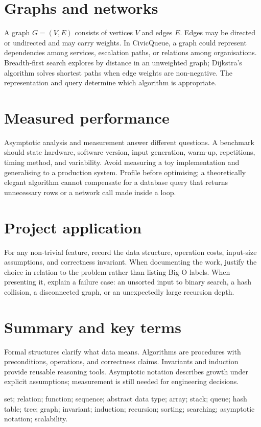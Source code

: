 \section{Graphs and networks}
A graph $G=(V,E)$ consists of vertices $V$ and edges $E$. Edges may be directed or undirected and may carry weights. In CivicQueue, a graph could represent dependencies among services, escalation paths, or relations among organisations. Breadth-first search explores by distance in an unweighted graph; Dijkstra's algorithm solves shortest paths when edge weights are non-negative. The representation and query determine which algorithm is appropriate.

\section{Measured performance}
Asymptotic analysis and measurement answer different questions. A benchmark should state hardware, software version, input generation, warm-up, repetitions, timing method, and variability. Avoid measuring a toy implementation and generalising to a production system. Profile before optimising; a theoretically elegant algorithm cannot compensate for a database query that returns unnecessary rows or a network call made inside a loop.

\section{Project application}
For any non-trivial feature, record the data structure, operation costs, input-size assumptions, and correctness invariant. When documenting the work, justify the choice in relation to the problem rather than listing Big-O labels. When presenting it, explain a failure case: an unsorted input to binary search, a hash collision, a disconnected graph, or an unexpectedly large recursion depth.

\section{Summary and key terms}
Formal structures clarify what data means. Algorithms are procedures with preconditions, operations, and correctness claims. Invariants and induction provide reusable reasoning tools. Asymptotic notation describes growth under explicit assumptions; measurement is still needed for engineering decisions.

\begin{keyterms}set; relation; function; sequence; abstract data type; array; stack; queue; hash table; tree; graph; invariant; induction; recursion; sorting; searching; asymptotic notation; scalability.\end{keyterms}

